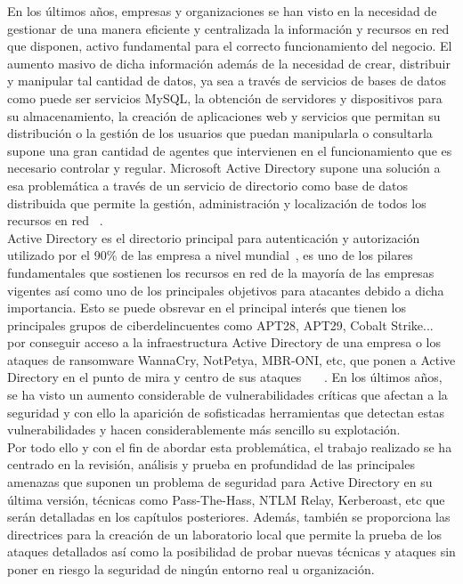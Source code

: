 En los últimos años, empresas y organizaciones se han visto en la necesidad de gestionar de una manera eficiente y centralizada la información y recursos en red que disponen, activo fundamental para el correcto funcionamiento del negocio. El aumento masivo de dicha información además de la necesidad de crear, distribuir y manipular tal cantidad de datos, ya sea a través de servicios de bases de datos como puede ser servicios MySQL, la obtención de servidores y dispositivos para su almacenamiento, la creación de  aplicaciones web y servicios que permitan su distribución o la gestión de los usuarios que puedan manipularla o consultarla supone una gran cantidad de agentes que intervienen en el funcionamiento que es necesario controlar y regular. Microsoft Active Directory supone una solución a esa problemática a través de un servicio de directorio como base de datos distribuida que permite la gestión, administración y localización de todos los recursos en red ~\cite{Capitulo1:Microsoft}.\\

Active Directory es el directorio principal para autenticación y autorización utilizado por el 90\% de las empresa a nivel mundial~\cite{Capitulo1:Percent}, es uno de los pilares fundamentales que sostienen los recursos en red de la mayoría de las empresas vigentes así como uno de los principales objetivos para atacantes  debido a dicha importancia. Esto se puede obsrevar en el principal interés que tienen los principales grupos de ciberdelincuentes como APT28, APT29, Cobalt Strike...  por conseguir acceso a la infraestructura Active Directory de una empresa o los ataques de ransomware WannaCry, NotPetya, MBR-ONI, etc, que ponen a Active Directory en el punto de mira y centro de sus ataques ~\cite{Capitulo1:Ransomware}~\cite{Capitulo1:Ransomware2}~\cite{Capitulo1:Ransomware3}. En los últimos años, se ha visto un aumento considerable de vulnerabilidades críticas que afectan a la seguridad y con ello la aparición de sofisticadas herramientas que detectan estas vulnerabilidades y hacen considerablemente más sencillo su explotación. \\

Por todo ello y con el fin de abordar esta problemática, el trabajo realizado se ha centrado en la revisión, análisis y prueba en profundidad de las principales amenazas que suponen un problema de seguridad para Active Directory en su última versión, técnicas como Pass-The-Hass, NTLM Relay, Kerberoast, etc que serán detalladas en los capítulos posteriores. Además, también se proporciona las directrices para la creación de un laboratorio local que permite la prueba de los ataques detallados así como la posibilidad de probar nuevas técnicas y ataques sin poner en riesgo la seguridad de ningún entorno real u organización.\\


